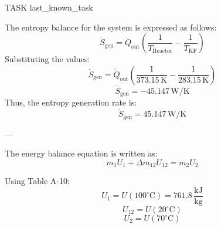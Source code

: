 TASK {last_known_task}

The entropy balance for the system is expressed as follows:
\[
\dot{S}_{\text{gen}} = \dot{Q}_{\text{out}} \left( \frac{1}{T_{\text{Reactor}}} - \frac{1}{T_{\text{KF}}} \right)
\]
Substituting the values:
\[
\dot{S}_{\text{gen}} = \dot{Q}_{\text{out}} \left( \frac{1}{373.15 \, \text{K}} - \frac{1}{283.15 \, \text{K}} \right)
\]
\[
\dot{S}_{\text{gen}} = -45.147 \, \text{W/K}
\]
Thus, the entropy generation rate is:
\[
\dot{S}_{\text{gen}} = 45.147 \, \text{W/K}
\]

---

The energy balance equation is written as:
\[
m_1 U_1 + \Delta m_{12} U_{12} = m_2 U_2
\]

Using Table A-10:
\[
U_1 = U(100^\circ\text{C}) = 761.8 \, \frac{\text{kJ}}{\text{kg}}
\]
\[
U_{12} = U(20^\circ\text{C})
\]
\[
U_2 = U(70^\circ\text{C})
\]